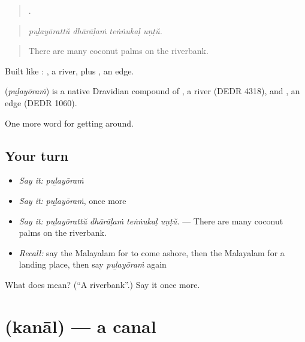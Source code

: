 \begin{quote}
   .
\end{quote}

\begin{quote}
\emph{puḻayōrattŭ dhārāḷaṁ teṅṅukaḷ uṇṭŭ.}
\end{quote}

\begin{quote}
There are many coconut palms on the riverbank.
\end{quote}

Built like : , a river, plus , an edge.

\begin{cousinweb}
\textbf{} (\emph{puḻayōraṁ}) is a native Dravidian compound of , a river (DEDR 4318), and , an edge (DEDR 1060).
\end{cousinweb}

\begin{grammarlens}[title={What you've built}]
One more word for getting around.
\end{grammarlens}

\subsection*{Your turn}
\begin{itemize}
\raggedright
  \item \emph{Say it:} \emph{puḻayōraṁ}
  \item \emph{Say it:} \emph{puḻayōraṁ}, once more
  \item \emph{Say it:} \emph{puḻayōrattŭ dhārāḷaṁ teṅṅukaḷ uṇṭŭ.} — There are many coconut palms on the riverbank.
  \item \emph{Recall:} say the Malayalam for to come ashore, then the Malayalam for a landing place, then say \emph{puḻayōraṁ} again
\end{itemize}

\begin{tcolorbox}[breakable,colback=teal!4,colframe=teal!35!black,title={Before you move on}]
What does  mean? (\textquotedblleft{}A riverbank\textquotedblright{}.) Say it once more.
\end{tcolorbox}
\section[\texorpdfstring{\ml{കനാൽ} (kanāl)}{കനാൽ (kanāl)}]{ (kanāl) — a canal}

